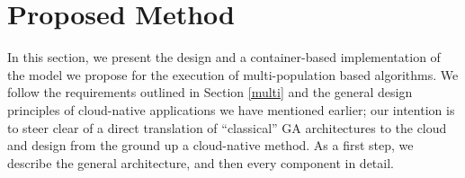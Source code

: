 \documentclass[review]{elsarticle}
\begin{document}




\section{Proposed Method} 
\label{method} 

In this section, we present the design
and a container-based implementation of the model we propose for the execution
of multi-population based algorithms. We follow the requirements outlined in
Section \ref{multi} and the general design principles of cloud-native
applications we have mentioned earlier; our intention is to steer
clear of a direct translation of ``classical'' GA architectures to the
cloud and design from the ground up a cloud-native method. As a first step, we describe the general
architecture, and then  every component in detail. 
\end{document}
